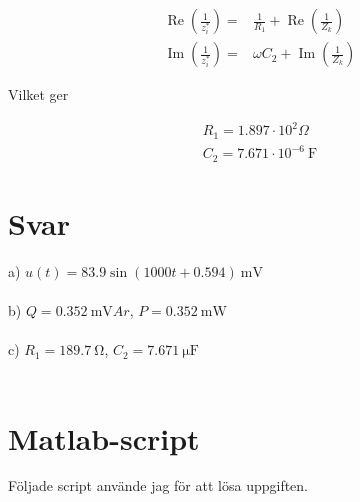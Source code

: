 \documentclass[a4paper]{article}
\begin{document}
\begin{align}
\operatorname{Re}(\frac{1}{z_i^*}) =& \frac{1}{R_1} + \operatorname{Re}(\frac{1}{Z_k}) \\
\operatorname{Im}(\frac{1}{z_i^*}) =&  \omega C_2 + \operatorname{Im}(\frac{1}{Z_k})
\end{align}

Vilket ger 

\begin{align}
    R_1 = 1.897 \cdot 10^2 \Omega \\
    C_2 = 7.671 \cdot 10^{-6} \SI{}{\farad}
\end{align}

\section{Svar}
a) $u(t) = 83.9\sin(1000t + 0.594) \SI{}{\milli\volt}$\\\\
b) $Q = 0.352 \SI{}{\milli\volt}Ar$, $P = 0.352 \SI{}{\milli\watt}$\\\\
c) $R_1 = 189.7 \SI{}{\ohm}$, $C_2 = 7.671 \SI{}{\micro\farad}$\\\\

\section{Matlab-script}

Följade script använde jag för att lösa uppgiften.

\end{document}
